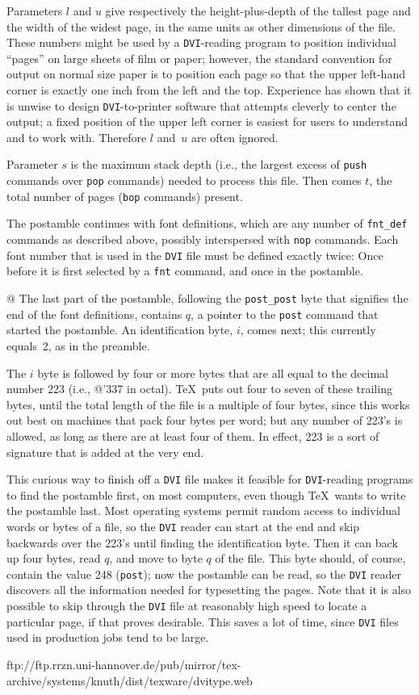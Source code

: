 \documentclass{article}
\begin{document}
Parameters $l$ and $u$ give respectively the height-plus-depth of the tallest
page and the width of the widest page, in the same units as other dimensions
of the file. These numbers might be used by a \texttt{DVI}-reading program to
position individual ``pages'' on large sheets of film or paper; however,
the standard convention for output on normal size paper is to position each
page so that the upper left-hand corner is exactly one inch from the left
and the top. 
Experience has shown that it is unwise to design \texttt{DVI}-to-printer
software that attempts cleverly to center the output; a fixed position of
the upper left corner is easiest for users to understand and to work with.
Therefore $l$ and~$u$ are often ignored.

Parameter $s$ is the maximum stack depth 
(i.e., 
the largest excess of \texttt{push} commands over \texttt{pop} commands)
 needed to process this file. 
Then comes $t$, the total number of pages (\texttt{bop} commands) present.

The postamble continues with font definitions, 
which are any number of \texttt{fnt\_def} commands as described above, 
possibly interspersed with \texttt{nop} commands. 
Each font number that is used in the \texttt{DVI} file must be defined
exactly twice: Once before it is first selected by a \texttt{fnt} command, 
and once in the postamble.

@ The last part of the postamble, following the \texttt{post\_post} byte 
that signifies the end of the font definitions, 
contains $q$, a pointer to the \texttt{post} command 
that started the postamble.  
An identification byte, $i$, comes next; 
this currently equals~2, as in the preamble.

The $i$ byte is followed by four or more bytes that are all equal to
the decimal number 223 (i.e., @'337 in octal). \TeX\ puts out four to seven of
these trailing bytes, until the total length of the file is a multiple of
four bytes, since this works out best on machines that pack four bytes per
word; but any number of 223's is allowed, as long as there are at least four
of them. In effect, 223 is a sort of signature that is added at the very end.


This curious way to finish off a \texttt{DVI} file makes it feasible for
\texttt{DVI}-reading programs to find the postamble first, on most computers,
even though \TeX\ wants to write the postamble last. Most operating
systems permit random access to individual words or bytes of a file, so
the \texttt{DVI} reader can start at the end and skip backwards over the 223's
until finding the identification byte. Then it can back up four bytes, read
$q$, and move to byte $q$ of the file. This byte should, of course,
contain the value 248 (\texttt{post}); now the postamble can be read, so the
\texttt{DVI} reader discovers all the information needed for typesetting the
pages. Note that it is also possible to skip through the \texttt{DVI} file at
reasonably high speed to locate a particular page, if that proves
desirable. 
This saves a lot of time, 
since \texttt{DVI} files used in production jobs tend to be large.

ftp://ftp.rrzn.uni-hannover.de/pub/mirror/tex-archive/systems/knuth/dist/texware/dvitype.web
\end{document}
